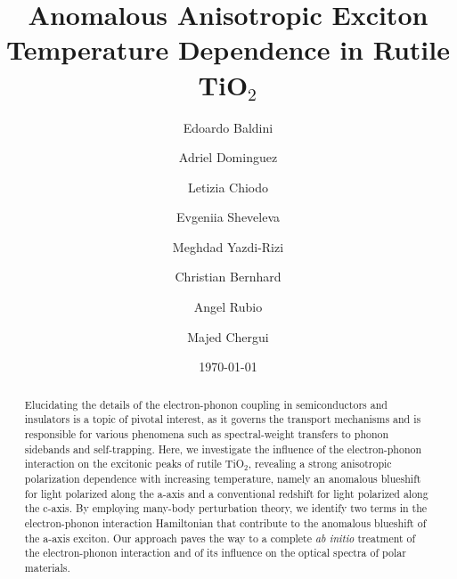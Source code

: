 \documentclass[aps,prl,twocolumn,amsfonts,nobibnotes,superscriptaddress,showpacs]{revtex4-1}
\begin{document}
\title{Anomalous Anisotropic Exciton Temperature Dependence in Rutile TiO$_2$}

\vspace{2cm}

\author{Edoardo Baldini}

\author{Adriel Dominguez}

\author{Letizia Chiodo}
	
\author{Evgeniia Sheveleva}

\author{Meghdad Yazdi-Rizi}
	
\author{Christian Bernhard}
	
\author{Angel Rubio}
	
\author{Majed Chergui}
	

\date{\today}



\begin{abstract}
Elucidating the details of the electron-phonon coupling in semiconductors and insulators is a topic of pivotal interest, as it governs the transport mechanisms and is responsible for various phenomena such as spectral-weight transfers to phonon sidebands and self-trapping. Here, we investigate the influence of the electron-phonon interaction on the excitonic peaks of rutile TiO$_2$, revealing a strong anisotropic polarization dependence with increasing temperature, namely an anomalous blueshift for light polarized along the a-axis and a conventional redshift for light polarized along the c-axis. By employing many-body perturbation theory, we identify two terms in the electron-phonon interaction Hamiltonian that contribute to the anomalous blueshift of the a-axis exciton. Our approach paves the way to a complete \textit{ab initio} treatment of the electron-phonon interaction and of its influence on the optical spectra of polar materials.
\end{abstract}
\end{document}
